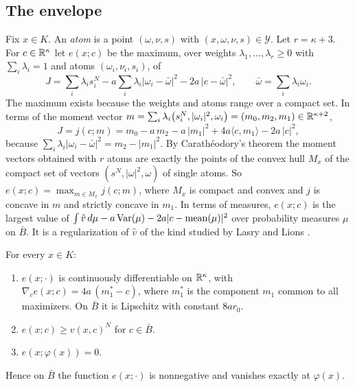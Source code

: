 \subsection{The envelope}

Fix $x\in K$. An \emph{atom} is a point $(\omega,\nu,s)$ with $(x,\omega,\nu,s)\in\mathcal Y$. Let $r=\kappa+3$. For $c\in\mathbb{R}^\kappa$ let $e(x;c)$ be the maximum, over weights $\lambda_1,\dots,\lambda_r\ge0$ with $\sum_i\lambda_i=1$ and atoms $(\omega_i,\nu_i,s_i)$, of
\begin{equation}\label{eq:J}
J=\sum_i\lambda_is_i^N-a\sum_i\lambda_i|\omega_i-\bar\omega|^2-2a\,|c-\bar\omega|^2,\qquad\bar\omega=\sum_i\lambda_i\omega_i .
\end{equation}
The maximum exists because the weights and atoms range over a compact set. In terms of the moment vector $m=\sum_i\lambda_i\bigl(s_i^N,|\omega_i|^2,\omega_i\bigr)=(m_0,m_2,m_1)\in\mathbb{R}^{\kappa+2}$,
\[
J=j(c;m)=m_0-a\,m_2-a\,|m_1|^2+4a\langle c,m_1\rangle-2a\,|c|^2 ,
\]
because $\sum_i\lambda_i|\omega_i-\bar\omega|^2=m_2-|m_1|^2$. By Carath\'eodory's theorem the moment vectors obtained with $r$ atoms are exactly the points of the convex hull $M_x$ of the compact set of vectors $(s^N,|\omega|^2,\omega)$ of single atoms. So $e(x;c)=\max_{m\in M_x}j(c;m)$, where $M_x$ is compact and convex and $j$ is concave in $m$ and strictly concave in $m_1$. In terms of measures, $e(x;c)$ is the largest value of $\int\hat v\,d\mu-a\operatorname{Var}(\mu)-2a|c-\operatorname{mean}(\mu)|^2$ over probability measures $\mu$ on $\bar B$. It is a regularization of $\hat v$ of the kind studied by Lasry and Lions \cite{LL86}.

\begin{lemma}\label{lem:envelope}
For every $x\in K$:
\begin{enumerate}[label=\textup{(\alph*)}]
\item $e(x;\cdot)$ is continuously differentiable on $\mathbb{R}^\kappa$, with $\nabla_ce(x;c)=4a\,(m_1^*-c)$, where $m_1^*$ is the component $m_1$ common to all maximizers. On $\bar B$ it is Lipschitz with constant $8ar_0$.
\item $e(x;c)\ge v(x,c)^N$ for $c\in\bar B$.
\item $e(x;\varphi(x))=0$.
\end{enumerate}
Hence on $\bar B$ the function $e(x;\cdot)$ is nonnegative and vanishes exactly at $\varphi(x)$.
\end{lemma}

